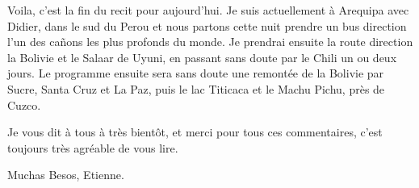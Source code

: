 \begin{multicols}{2}
Voila, c'est la fin du recit pour aujourd'hui. Je suis actuellement à Arequipa avec Didier, dans le sud du Perou et nous partons cette nuit prendre un bus direction l'un des cañons les plus profonds du monde. Je prendrai ensuite la route direction la Bolivie et le Salaar de Uyuni, en passant sans doute par le Chili un ou deux jours. Le programme ensuite sera sans doute une remontée de la Bolivie par Sucre, Santa Cruz et La Paz, puis le lac Titicaca et le Machu Pichu, près de Cuzco.

Je vous dit à tous à très bientôt, et merci pour tous ces commentaires, c'est toujours très agréable de vous lire.

Muchas Besos, Etienne.

\end{multicols}


